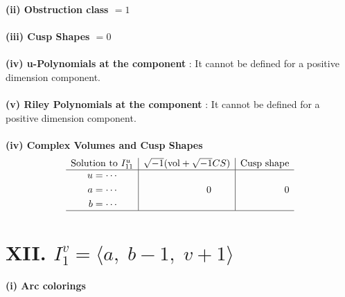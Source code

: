 \documentclass[1p]{elsarticle_modified}
\theoremstyle{definition}
\newcommand{\I}{\sqrt{-1}}
\begin{document}
\flushleft \textbf{(ii) Obstruction class $= 1$}\\~\\
\flushleft \textbf{(iii) Cusp Shapes $= 0$}\\~\\
\flushleft \textbf{(iv) u-Polynomials at the component} : It cannot be defined for a positive dimension component.\\~\\
\flushleft \textbf{(v) Riley Polynomials at the component} : It cannot be defined for a positive dimension component.\\~\\
\newpage\flushleft \textbf{(iv) Complex Volumes and Cusp Shapes}
$$\begin{array}{c|c|c} 
\text{Solution to }I^u_{11}& \I (\text{vol} + \sqrt{-1}CS) & \text{Cusp shape}\\
 \hline 
\begin{aligned}
u &= \cdots \\
a &= \cdots \\
b &= \cdots\end{aligned}
 & \phantom{-0.000000 } 0 & \phantom{-0.000000 } 0\\
 \hline 
 \end{array}
$$\newpage\renewcommand{\arraystretch}{1}
\centering \section*{XII. $I^v_{1}= \langle a,\;b-1,\;v+1 \rangle$}
\flushleft \textbf{(i) Arc colorings}\\
\end{document}

